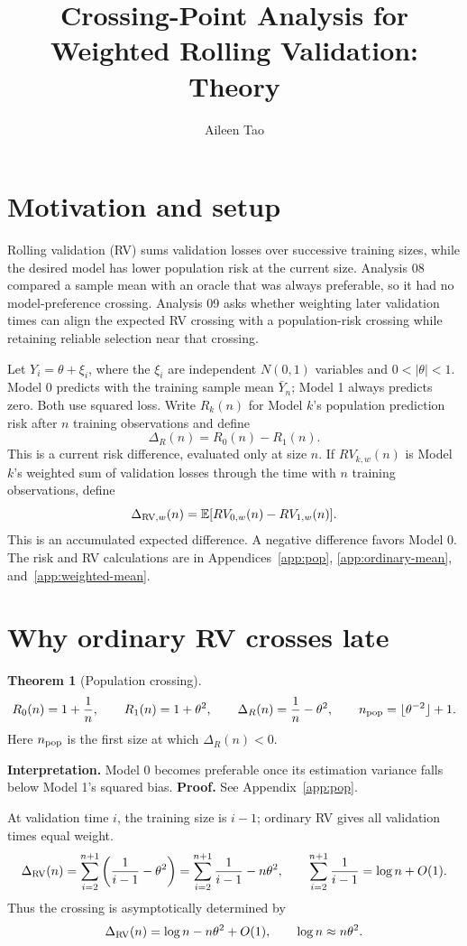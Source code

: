 \documentclass[11pt]{article}
\title{Crossing-Point Analysis for Weighted Rolling Validation: Theory}
\author{Aileen Tao}
\date{}
\theoremstyle{definition}
\newtheorem{theorem}{Theorem}[section]
\begin{document}
\maketitle

\section{Motivation and setup}

Rolling validation (RV) sums validation losses over successive training
sizes, while the desired model has lower population risk at the
current size. Analysis 08 compared a sample mean with an oracle
that was always preferable, so it had no model-preference crossing.
Analysis 09 asks whether weighting later validation times can align
the expected RV crossing with a population-risk crossing while
retaining reliable selection near that crossing.

Let $Y_i=\theta+\xi_i$, where the $\xi_i$ are independent $N(0,1)$
variables and $0<|\theta|<1$. Model 0 predicts with the training
sample mean $\bar Y_n$; Model 1 always predicts zero. Both use
squared loss. Write $R_k(n)$ for Model $k$'s population prediction
risk after $n$ training observations and define
\[
\Delta_R(n)=R_0(n)-R_1(n).
\]
This is a current risk difference, evaluated only at size $n$.
If $RV_{k,w}(n)$ is Model $k$'s weighted sum of validation losses
through the time with $n$ training observations, define
\[
\Delta_{{\rm RV},w}(n)=\mathbb E[RV_{0,w}(n)-RV_{1,w}(n)].
\]
This is an accumulated expected difference. A negative
difference favors Model 0. The risk and RV calculations are in
Appendices~\ref{app:pop}, \ref{app:ordinary-mean},
and~\ref{app:weighted-mean}.

\section{Why ordinary RV crosses late}

\begin{theorem}[Population crossing]\label{thm:population}
\[
R_0(n)=1+\frac1n,\qquad R_1(n)=1+\theta^2,\qquad
\Delta_R(n)=\frac1n-\theta^2,
\qquad n_{\rm pop}=\lfloor\theta^{-2}\rfloor+1.
\]
Here $n_{\rm pop}$ is the first size at which $\Delta_R(n)<0$.
\end{theorem}
\noindent\textbf{Interpretation.} Model 0 becomes preferable once
its estimation variance falls below Model 1's squared bias.
\textbf{Proof.} See Appendix~\ref{app:pop}.

\medskip
At validation time $i$, the training size is $i-1$; ordinary RV
gives all validation times equal weight.
\begin{equation}\label{eq:ordinary}
\Delta_{\rm RV}(n)
=\sum_{i=2}^{n+1}\left(\frac1{i-1}-\theta^2\right)
=\sum_{i=2}^{n+1}\frac1{i-1}-n\theta^2,
\qquad \sum_{i=2}^{n+1}\frac1{i-1}=\log n+O(1).
\end{equation}
Thus the crossing is asymptotically determined by
\[
\Delta_{\rm RV}(n)=\log n-n\theta^2+O(1),\qquad
\log n\approx n\theta^2.
\]
\end{document}
